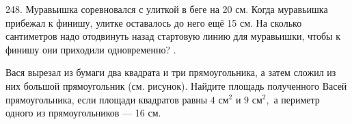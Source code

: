 248. Муравьишка соревновался с улиткой в беге на 20 см. Когда муравьишка прибежал к финишу, улитке оставалось до него ещё 15 см. На сколько сантиметров надо отодвинуть назад стартовую линию для муравьишки, чтобы к финишу они приходили одновременно?\newpage
{}. \begin{center}
\begin{figure}[ht!]
\end{figure}
\end{center}
Вася вырезал из бумаги два квадрата и три прямоугольника, а затем сложил из них большой прямоугольник (см. рисунок). Найдите площадь  полученного Васей прямоугольника, если площади квадратов равны $4\text{ см}^2$ и $9\text{ см}^2,$ а периметр одного из прямоугольников --- 16 см.\\
